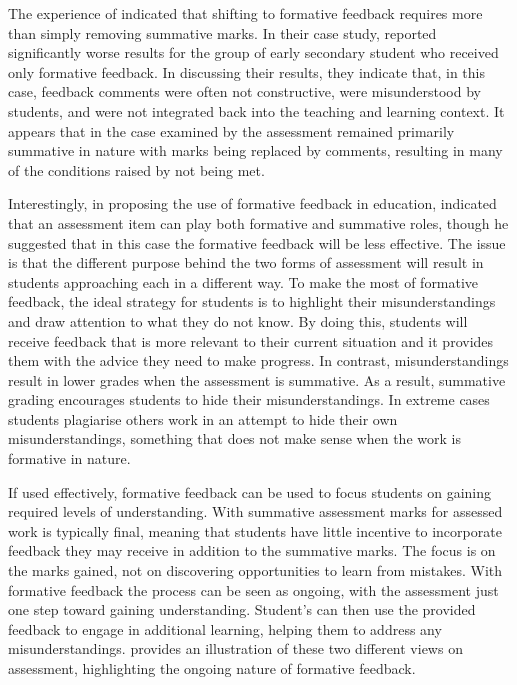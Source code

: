 
The experience of \citet{Smith:2005} indicated that shifting to formative feedback requires more than simply removing summative marks. In their case study, \citet{Smith:2005} reported significantly worse results for the group of early secondary student who received only formative feedback. In discussing their results, they indicate that, in this case, feedback comments were often not constructive, were misunderstood by students, and were not integrated back into the teaching and learning context. It appears that in the case examined by \citet{Smith:2005} the assessment remained primarily summative in nature with marks being replaced by comments, resulting in many of the conditions raised by \citet{Gibbs:2004} not being met.

Interestingly, in proposing the use of formative feedback in education, \citet{Bloom:1969} indicated that an assessment item can play both formative and summative roles, though he suggested that in this case the formative feedback will be less effective. The issue is that the different purpose behind the two forms of assessment will result in students approaching each in a different way. To make the most of formative feedback, the ideal strategy for students is to highlight their misunderstandings and draw attention to what they do not know. By doing this, students will receive feedback that is more relevant to their current situation and it provides them with the advice they need to make progress. In contrast, misunderstandings result in lower grades when the assessment is summative. As a result, summative grading encourages students to hide their misunderstandings. In extreme cases students plagiarise others work in an attempt to hide their own misunderstandings, something that does not make sense when the work is formative in nature. 

If used effectively, formative feedback can be used to focus students on gaining required levels of understanding. With summative assessment marks for assessed work is typically final, meaning that students have little incentive to incorporate feedback they may receive in addition to the summative marks. The focus is on the marks gained, not on discovering opportunities to learn from mistakes. With formative feedback the process can be seen as ongoing, with the assessment just one step toward gaining understanding. Student's can then use the provided feedback to engage in additional learning, helping them to address any misunderstandings.  provides an illustration of these two different views on assessment, highlighting the ongoing nature of formative feedback.

